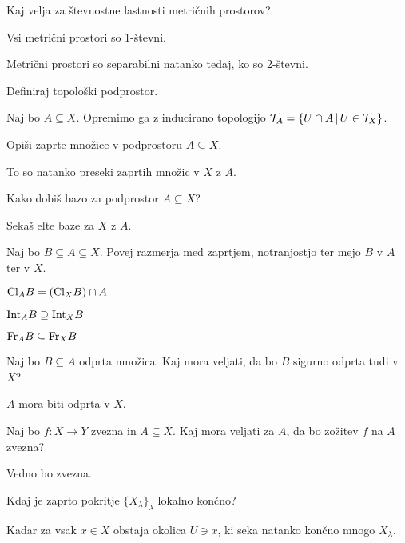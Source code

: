 \begin{vo}{Kaj velja za števnostne lastnosti metričnih prostorov?}

Vsi metrični prostori so 1-števni.

Metrični prostori so separabilni natanko tedaj, ko so 2-števni.

\end{vo}

\begin{vo}{Definiraj topološki podprostor.}

Naj bo $A \subseteq X$. Opremimo ga z inducirano topologijo
$\mathcal{T}_A = \{ U \cap A \,|\, U \in \mathcal{T}_X \}$.

\end{vo}

\begin{vo}{Opiši zaprte množice v podprostoru $A \subseteq X$.}

To so natanko preseki zaprtih množic v $X$ z $A$.

\end{vo}

\begin{vo}{Kako dobiš bazo za podprostor $A \subseteq X$?}

Sekaš elte baze za $X$ z $A$.

\end{vo}

\begin{vo}{Naj bo $B \subseteq A \subseteq X$. Povej razmerja med zaprtjem,
notranjostjo ter mejo $B$ v $A$ ter v $X$.}

$\text{Cl}_A B = (\text{Cl}_X B) \cap A$

$\text{Int}_A B \supseteq \text{Int}_X B$

$\text{Fr}_A B \subseteq \text{Fr}_X B$

\end{vo}

\begin{vo}{Naj bo $B \subseteq A$ odprta množica. Kaj mora veljati, da bo
$B$ sigurno odprta tudi v $X$?}

$A$ mora biti odprta v $X$.

\end{vo}

\begin{vo}{Naj bo $f: X \to Y$ zvezna in $A \subseteq X$.
  Kaj mora veljati za $A$, da bo zožitev $f$ na $A$ zvezna?}

Vedno bo zvezna.

\end{vo}

\begin{vo}{Kdaj je zaprto pokritje $\{X_\lambda\}_\lambda$ lokalno končno?}

Kadar za vsak $x \in X$ obstaja okolica $U \ni x$, ki seka natanko končno mnogo
$X_\lambda$.

\end{vo}

